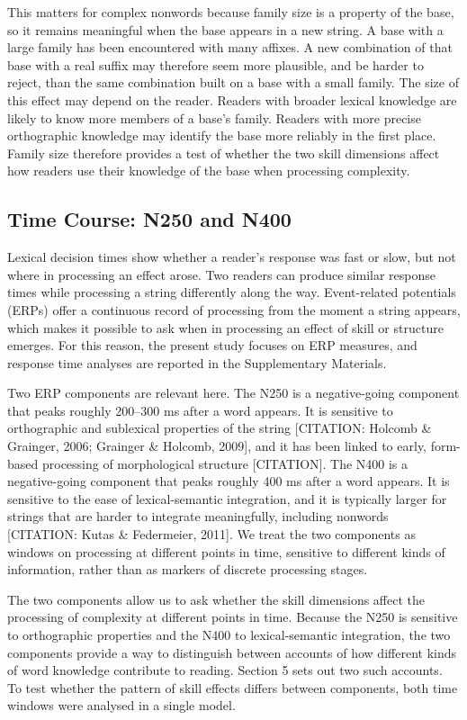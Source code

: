 \documentclass[utf8]{FrontiersinHarvard} %
\begin{document}
	This matters for complex nonwords because family size is a property of the base, so it remains meaningful when the base appears in a new string. A base with a large family has been encountered with many affixes. A new combination of that base with a real suffix may therefore seem more plausible, and be harder to reject, than the same combination built on a base with a small family. The size of this effect may depend on the reader. Readers with broader lexical knowledge are likely to know more members of a base’s family. Readers with more precise orthographic knowledge may identify the base more reliably in the first place. Family size therefore provides a test of whether the two skill dimensions affect how readers use their knowledge of the base when processing complexity.
	

	\subsection{Time Course: N250 and N400}
	
	Lexical decision times show whether a reader’s response was fast or slow, but not where in processing an effect arose. Two readers can produce similar response times while processing a string differently along the way. Event-related potentials (ERPs) offer a continuous record of processing from the moment a string appears, which makes it possible to ask when in processing an effect of skill or structure emerges. For this reason, the present study focuses on ERP measures, and response time analyses are reported in the Supplementary Materials.
	
	Two ERP components are relevant here. The N250 is a negative-going component that peaks roughly 200–300 ms after a word appears. It is sensitive to orthographic and sublexical properties of the string [CITATION: Holcomb \& Grainger, 2006; Grainger \& Holcomb, 2009], and it has been linked to early, form-based processing of morphological structure [CITATION]. The N400 is a negative-going component that peaks roughly 400 ms after a word appears. It is sensitive to the ease of lexical-semantic integration, and it is typically larger for strings that are harder to integrate meaningfully, including nonwords [CITATION: Kutas \& Federmeier, 2011]. We treat the two components as windows on processing at different points in time, sensitive to different kinds of information, rather than as markers of discrete processing stages.
	
	The two components allow us to ask whether the skill dimensions affect the processing of complexity at different points in time. Because the N250 is sensitive to orthographic properties and the N400 to lexical-semantic integration, the two components provide a way to distinguish between accounts of how different kinds of word knowledge contribute to reading. Section 5 sets out two such accounts. To test whether the pattern of skill effects differs between components, both time windows were analysed in a single model.
	
\end{document}
